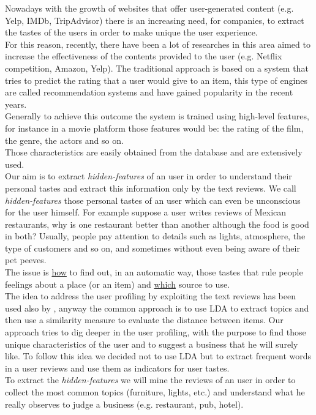 \documentclass[11pt]{article}
\begin{document}
Nowadays with the growth of websites that offer user-generated content (e.g. Yelp, IMDb, TripAdvisor) there is an increasing need, for companies, to extract the tastes of the users in order to make unique the user experience.\\
For this reason, recently, there have been a lot of researches in this area aimed to increase the effectiveness of the contents provided to the user (e.g. Netflix competition\cite{Netflix}, Amazon, Yelp\cite{Nikulin}).
The traditional approach is based on a system that tries to predict the rating that a user would give to an item, this type of engines are called recommendation systems and have gained popularity in the recent years.\\
Generally to achieve this outcome the system is trained using high-level features, for instance in a movie platform those features would be: the rating of the film, the genre, the actors and so on.\\
Those characteristics are easily obtained from the database and are extensively used.\\
Our aim is to extract \textit{hidden-features} of an user in order to understand their personal tastes and extract this information only by the text reviews.
We call \textit{hidden-features} those personal tastes of an user which can even be unconscious for the user himself. 
For example suppose a user writes reviews of Mexican restaurants, why is one restaurant better than another although the food is good in both? Usually, people pay attention to details such as lights, atmosphere, the type of customers and so on, and sometimes without even being aware of their pet peeves.\\
The issue is \underline{how} to find out, in an automatic way, those tastes that rule people feelings about a place (or an item) and \underline{which} source to use.\\
The idea to address the user profiling by exploiting the text reviews has been used also by \cite{Dupuy}, anyway the common approach is to use LDA to extract topics and then use a similarity measure to evaluate the distance between items. Our approach tries to dig deeper in the user profiling, with the purpose to find those unique characteristics of the user and to suggest a business that he will surely like. To follow this idea we decided not to use LDA but to extract frequent words in a  user reviews and use them as indicators for user tastes.\\
To extract the \textit{hidden-features} we will mine the reviews of an user in order to collect the most common topics (furniture, lights, etc.) and  understand what he really observes to judge a business (e.g. restaurant, pub, hotel).
\end{document}

